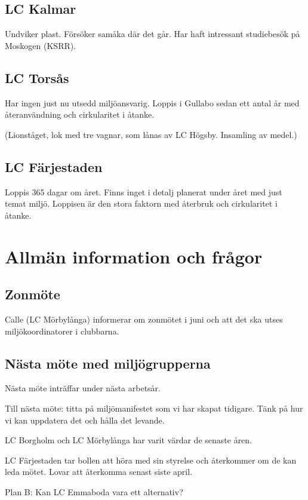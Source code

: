 \documentclass[12pt,a4paper]{article}
\begin{document}
\subsection{LC Kalmar}
Undviker plast. Försöker samåka där det går.
Har haft intressant studiebesök på Moskogen (KSRR).

\subsection{LC Torsås}
Har ingen just nu utsedd miljöansvarig.
Loppis i Gullabo sedan ett antal år med återanvändning och cirkularitet i åtanke.

(Lionståget, lok med tre vagnar, som lånas av LC Högsby. Insamling av medel.)

\subsection{LC Färjestaden}
Loppis 365 dagar om året.
Finns inget i detalj planerat under året med just temat miljö.
Loppisen är den stora faktorn med återbruk och cirkularitet i åtanke.

\section{Allmän information och frågor}

\subsection{Zonmöte}
Calle (LC Mörbylånga) informerar om zonmötet i juni och att det ska utses miljökoordinatorer i clubbarna.

\subsection{Nästa möte med miljögrupperna}

Nästa möte inträffar under nästa arbetsår.

Till nästa möte: titta på miljömanifestet som vi har skapat tidigare. Tänk på hur vi kan uppdatera det och hålla det levande.

LC Borgholm och LC Mörbylånga har varit värdar de senaste åren.

LC Färjestaden tar bollen att höra med sin styrelse och återkommer om de kan leda mötet.
Lovar att återkomma senast siste april.

Plan B: Kan LC Emmaboda vara ett alternativ? 
\end{document}
